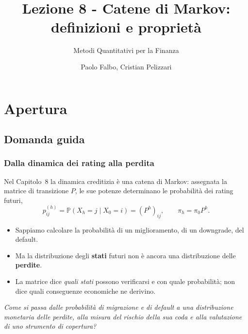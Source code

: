 \documentclass[handout]{beamer}%
\title[Catene di Markov: definizioni e propriet\`{a}]{Lezione 8 - Catene di Markov: definizioni e propriet\`{a}}
\subtitle{Metodi Quantitativi per la Finanza}
\author[P. Falbo, C. Pelizzari]{{\LARGE Paolo Falbo, Cristian Pelizzari}}
\institute[]{{\large Dipartimento Economia e Management}}
\date[]{}
\newenvironment{stepitemize}{\begin{itemize}[<+->]}{\end{itemize} }
\providecommand{\Prob}{\mathbb{P}}
\providecommand{\QTR}[2]{\csname #1\endcsname{#2}}
\begin{document}
\maketitle

\section{Apertura}


\subsection{Domanda guida}%

\begin{frame}%
%

\frametitle{Dalla dinamica dei rating alla perdita}%
%

%

Nel Capitolo~8 la dinamica creditizia \`{e} una catena di Markov: assegnata
la matrice di transizione $P$, le sue potenze determinano le
probabilit\`{a} dei rating futuri,
\[
p_{ij}^{(h)}=\Prob(X_h=j\mid X_0=i)=(P^h)_{ij},
\qquad
\pi_h=\pi_0P^h.
\]

\medskip

\begin{stepitemize}
\item Sappiamo calcolare la probabilit\`{a} di un miglioramento, di un
downgrade, del default.

\item Ma la distribuzione degli \textbf{stati} futuri non \`{e} ancora una
distribuzione delle \textbf{perdite}.

\item La matrice dice \emph{quali stati} possono verificarsi e con quale
probabilit\`{a}; non dice quali conseguenze economiche ne derivino.
\end{stepitemize}

\medskip

\begin{center}
{\small \emph{Come si passa dalle probabilit\`{a} di migrazione e di
default a una distribuzione monetaria delle perdite, alla misura del
rischio della sua coda e alla valutazione di uno strumento di
copertura?}}
\end{center}

\transboxout
\end{frame}%
\end{document}
